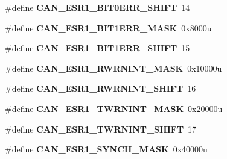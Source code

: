 \begin{DoxyCompactItemize}
\item 
\hypertarget{group___c_a_n___register___masks_ga949e83e6333f8b4ddd5b2fb77585e2e9}{}\#define {\bfseries C\+A\+N\+\_\+\+E\+S\+R1\+\_\+\+B\+I\+T0\+E\+R\+R\+\_\+\+S\+H\+I\+F\+T}~14\label{group___c_a_n___register___masks_ga949e83e6333f8b4ddd5b2fb77585e2e9}

\item 
\hypertarget{group___c_a_n___register___masks_ga8a260202c5a157354042a1fba8cbc882}{}\#define {\bfseries C\+A\+N\+\_\+\+E\+S\+R1\+\_\+\+B\+I\+T1\+E\+R\+R\+\_\+\+M\+A\+S\+K}~0x8000u\label{group___c_a_n___register___masks_ga8a260202c5a157354042a1fba8cbc882}

\item 
\hypertarget{group___c_a_n___register___masks_ga2118504746ecc7ba810d5ed44dd7c31f}{}\#define {\bfseries C\+A\+N\+\_\+\+E\+S\+R1\+\_\+\+B\+I\+T1\+E\+R\+R\+\_\+\+S\+H\+I\+F\+T}~15\label{group___c_a_n___register___masks_ga2118504746ecc7ba810d5ed44dd7c31f}

\item 
\hypertarget{group___c_a_n___register___masks_gaf0e71745a764581c68a93feef2db8602}{}\#define {\bfseries C\+A\+N\+\_\+\+E\+S\+R1\+\_\+\+R\+W\+R\+N\+I\+N\+T\+\_\+\+M\+A\+S\+K}~0x10000u\label{group___c_a_n___register___masks_gaf0e71745a764581c68a93feef2db8602}

\item 
\hypertarget{group___c_a_n___register___masks_gafcbf44277d9766061369a79e2ff761a2}{}\#define {\bfseries C\+A\+N\+\_\+\+E\+S\+R1\+\_\+\+R\+W\+R\+N\+I\+N\+T\+\_\+\+S\+H\+I\+F\+T}~16\label{group___c_a_n___register___masks_gafcbf44277d9766061369a79e2ff761a2}

\item 
\hypertarget{group___c_a_n___register___masks_gaf6b96813ed300d4649d7daec40351861}{}\#define {\bfseries C\+A\+N\+\_\+\+E\+S\+R1\+\_\+\+T\+W\+R\+N\+I\+N\+T\+\_\+\+M\+A\+S\+K}~0x20000u\label{group___c_a_n___register___masks_gaf6b96813ed300d4649d7daec40351861}

\item 
\hypertarget{group___c_a_n___register___masks_ga651c6aee47d004060a9dbc10369cf784}{}\#define {\bfseries C\+A\+N\+\_\+\+E\+S\+R1\+\_\+\+T\+W\+R\+N\+I\+N\+T\+\_\+\+S\+H\+I\+F\+T}~17\label{group___c_a_n___register___masks_ga651c6aee47d004060a9dbc10369cf784}

\item 
\hypertarget{group___c_a_n___register___masks_ga908135f00230ede2890a9db408908d34}{}\#define {\bfseries C\+A\+N\+\_\+\+E\+S\+R1\+\_\+\+S\+Y\+N\+C\+H\+\_\+\+M\+A\+S\+K}~0x40000u\label{group___c_a_n___register___masks_ga908135f00230ede2890a9db408908d34}


\end{DoxyCompactItemize}
